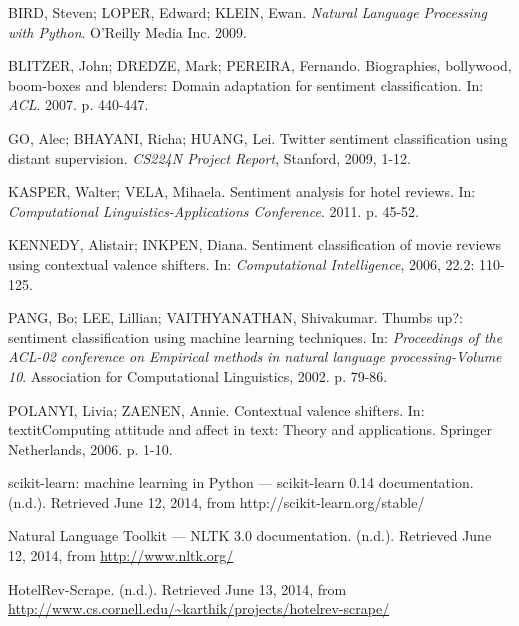 \documentclass{article}
\begin{document}
\begin{thebibliography}{1}

BIRD, Steven; LOPER, Edward; KLEIN, Ewan. \textit{Natural Language Processing with Python}. O’Reilly Media Inc. 2009.

BLITZER, John; DREDZE, Mark; PEREIRA, Fernando. Biographies, bollywood, boom-boxes and blenders: Domain adaptation for sentiment classification. In: \textit{ACL}. 2007. p. 440-447.

GO, Alec; BHAYANI, Richa; HUANG, Lei. Twitter sentiment classification using distant supervision. \textit{CS224N Project Report}, Stanford, 2009, 1-12.

KASPER, Walter; VELA, Mihaela. Sentiment analysis for hotel reviews. In: \textit{Computational Linguistics-Applications Conference}. 2011. p. 45-52.

KENNEDY, Alistair; INKPEN, Diana. Sentiment classification of movie reviews using contextual valence shifters. In: \textit{Computational Intelligence}, 2006, 22.2: 110-125.

PANG, Bo; LEE, Lillian; VAITHYANATHAN, Shivakumar. Thumbs up?: sentiment classification using machine learning techniques. In: \textit{Proceedings of the ACL-02 conference on Empirical methods in natural language processing-Volume 10}. Association for Computational Linguistics, 2002. p. 79-86.

POLANYI, Livia; ZAENEN, Annie. Contextual valence shifters. In: textit{Computing attitude and affect in text: Theory and applications}. Springer Netherlands, 2006. p. 1-10.

scikit-learn: machine learning in Python — scikit-learn 0.14 documentation. (n.d.). Retrieved June 12, 2014, from http://scikit-learn.org/stable/

Natural Language Toolkit — NLTK 3.0 documentation. (n.d.). Retrieved June 12, 2014, from \url{http://www.nltk.org/}

HotelRev-Scrape. (n.d.). Retrieved June 13, 2014, from \url{http://www.cs.cornell.edu/~karthik/projects/hotelrev-scrape/}

\end{thebibliography}
\end{document}
